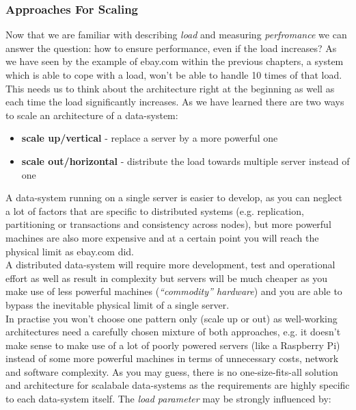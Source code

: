 \subsubsection{Approaches For Scaling}
\label{tf_nfreq_scalability_approaches}
Now that we are familiar with describing \textit{load} and measuring \textit{perfromance} we can answer the question: how to ensure performance, even if the load increases?
As we have seen by the example of ebay.com within the previous chapters, a system which is able to cope with a load, won't be able to handle 10 times of that load. This needs us to think about the architecture right at the beginning as well as each time the load significantly increases. As we have learned there are two ways to scale an architecture of a data-system:

\begin{itemize}
			\item \textbf{scale up/vertical} - replace a server by a more powerful one
			\item \textbf{scale out/horizontal} - distribute the load towards multiple server instead of one\\
\end{itemize}

A data-system running on a single server is easier to develop, as you can neglect a lot of factors that are specific to distributed systems (e.g. replication, partitioning or transactions and consistency across nodes), but more powerful machines are also more expensive and at a certain point you will reach the physical limit as ebay.com did. \\
A distributed data-system will require more development, test and operational effort as well as result in complexity but servers will be much cheaper as you make use of less powerful machines (\textit{``commodity'' hardware}) and you are able to bypass the inevitable physical limit of a single server. \\
In practise you won't choose one pattern only (scale up or out) as well-working architectures need a carefully chosen mixture of both approaches, e.g. it doesn't make sense to make use of a lot of poorly powered servers (like a Raspberry Pi) instead of some more powerful machines in terms of unnecessary costs, network and software complexity. As you may guess, there is no one-size-fits-all solution and architecture for scalabale data-systems as the requirements are highly specific to each data-system itself. The \textit{load parameter} may be strongly influenced by:

